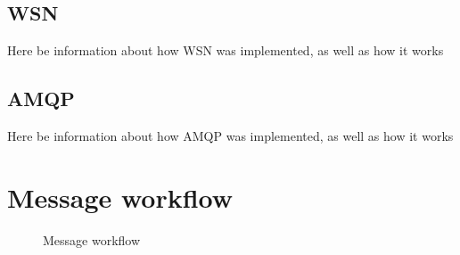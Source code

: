 \subsection{WSN}

Here be information about how WSN was implemented, as well as how it works

\subsection{AMQP}

Here be information about how AMQP was implemented, as well as how it works

\clearpage

\section{Message workflow}

\begin{center}
  \begin{figure}[ht!]
    \caption{Message workflow}
    \label{fig:Message workflow}
  \end{figure}
\end{center}

\clearpage